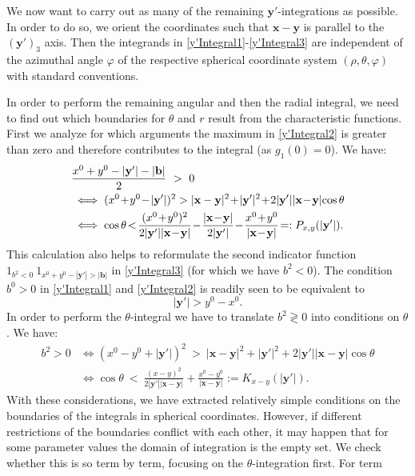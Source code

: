 \documentclass[b5paper,draft,openbib,12pt]{memoir}
\newcommand{\vx}{\mathbf{x}}
\newcommand{\vy}{\mathbf{y}}
\newcommand{\vb}{\mathbf{b}}
\begin{document}
We now want to carry out as many of the remaining 
$\vy'$-integrations as possible. In order to do so, 
we orient the coordinates such that \(\vx-\vy\) is 
parallel to the \((\vy')_3\) axis. Then the integrands 
in \eqref{y'Integral1}-\eqref{y'Integral3} are 
independent of the azimuthal angle $\varphi$ of the 
respective spherical coordinate system 
$(\rho,\theta,\varphi)$ with standard conventions.

In order to perform the remaining angular and then the 
radial integral, we need to find out which boundaries 
for $\theta$ and $r$ result from the characteristic 
functions. First we analyze for which arguments the 
maximum in \eqref{y'Integral2} is greater than zero 
and therefore contributes to the integral (as 
$g_1(0) = 0$). We have:
\begin{align}\notag
  &\frac{x^0+y^0-|\vy'|-|\vb|}{2}~>~0 \\
  &\iff  (x^0\!+\!y^0\!-\!|\vy'|)^2>|\vx-\vy|^2\!+\!|\vy'|^2\!+\!2|\vy'||\vx\!-\!\vy|\!\cos\theta\nonumber\\
  &\iff \cos\theta\!<\!\frac{(x^0\!+\!y^0)^2}{2|\vy'||\vx\!-\!\vy|} \!-\!\frac{|\vx\!-\!\vy|}{2|\vy'|} \!-\! \frac{x^0\!+\!y^0}{|\vx\!-\!\vy|}\!=:P_{x,y}(|\vy'|).
\label{eq:costhetapxy}
\end{align}
This calculation also helps to reformulate the second 
indicator function $1_{b^2<0}~1_{x^0+y^0-|\vy'|>
|\vb|}$ in \eqref{y'Integral3} (for which we have 
\(b^2<0\)).
The condition \(b^0>0\) in \eqref{y'Integral1} and 
\eqref{y'Integral2} is readily seen to be equivalent 
to
\begin{equation}
	|\vy'|>y^0-x^0.
	\label{eq:b0cond}
\end{equation}
In order to perform the \(\theta\)-integral we have 
to translate \(b^2\gtrless 0\) into conditions on 
\(\theta\). We have:
\begin{align}
    b^2>0 &\iff (x^0-y^0+|\vy'|)^2~>~ |\vx-\vy|^2+|\vy'|^2+2|\vy'||\vx-\vy|\cos\theta \nonumber\\
    &\iff \cos\theta~<~ \frac{(x-y)^2}{2|\vy'||\vx-\vy|} + \frac{x^0-y^0}{|\vx-\vy|}:=K_{x-y}(|\vy'|).
\label{eq:costhetakxy}
\end{align}
With these considerations, we have extracted 
relatively simple conditions on the boundaries of the 
integrals in spherical coordinates. However, if 
different restrictions of the boundaries conflict 
with each other, it may happen that for some 
parameter values the domain of integration is the 
empty set. 
We check whether this is so term by term, focusing 
on the \(\theta\)-integration first. For term 
\end{document}
